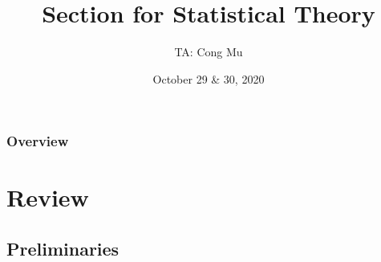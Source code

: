 \documentclass[serif,mathserif,professionalfont]{beamer}
\title[Section for EN.553.730]{Section for Statistical Theory} %
\author{TA: Cong Mu} %
\institute[cmu2@jhu.edu] %
{
Office Hour: Wednesday 09:30AM - 11:30AM
\medskip
\textit{} %
}
\date{October 29 \& 30, 2020} %
\begin{document}
\begin{frame}
\titlepage %
\end{frame}

\begin{frame}
\frametitle{Overview} %
\tableofcontents %
\end{frame}





%	
%	
%	
%	


\section{Review}



\subsection{Preliminaries}
\end{document}
